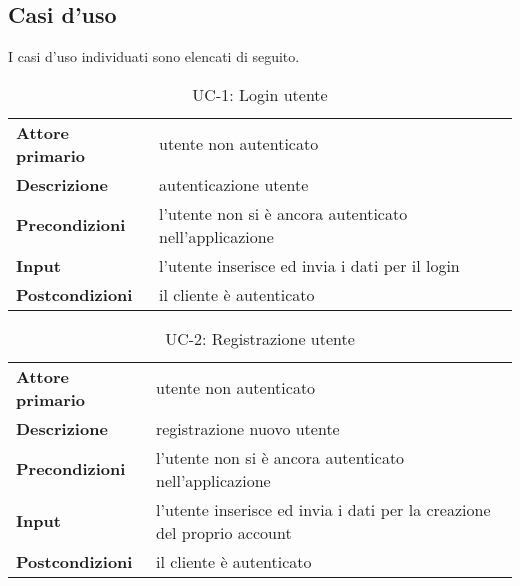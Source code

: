 \subsection{Casi d'uso}

I casi d'uso individuati sono elencati di seguito.

\begin{table}[H]
    \centering
    \begin{tabular}{|p{3cm}p{11.15cm}|}
        \hline
        \textbf{Attore primario} & utente non autenticato \\
        \textbf{Descrizione} & autenticazione utente \\
        \textbf{Precondizioni} & l’utente non si è ancora autenticato nell’applicazione \\
        \textbf{Input} & l’utente inserisce ed invia i dati per il login \\
        \textbf{Postcondizioni} & il cliente è autenticato \\\hline
    \end{tabular}
    \caption{UC-1: Login utente}
\end{table}
\begin{table}[H]
    \centering
    \begin{tabular}{|p{3cm}p{11.15cm}|}
        \hline
        \textbf{Attore primario} & utente non autenticato \\
        \textbf{Descrizione} & registrazione nuovo utente \\
        \textbf{Precondizioni} & l’utente non si è ancora autenticato nell’applicazione \\
        \textbf{Input} & l’utente inserisce ed invia i dati per la creazione del proprio account \\
        \textbf{Postcondizioni} & il cliente è autenticato \\\hline
    \end{tabular}
    \caption{UC-2: Registrazione utente}
\end{table}
